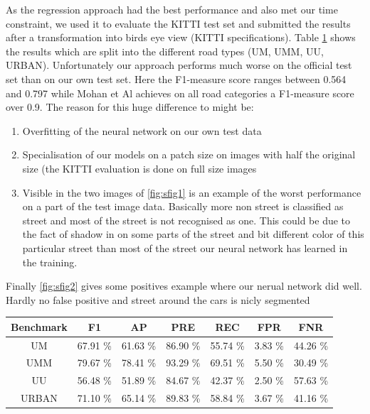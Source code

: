 As the regression approach had the best performance and also met our time constraint, we used it to evaluate the KITTI test set and submitted the results after a transformation into birds eye view (KITTI specifications). Table \ref{tab:kitti} shows the results which are split into the different road types (UM, UMM, UU, URBAN).
Unfortunately our approach performs much worse on the official test set than on our own test set. Here the F1-measure score ranges between 0.564 and 0.797 while Mohan et Al achieves on all road categories a F1-measure score over 0.9. The reason for this huge difference to might be: \\

\begin{enumerate}
  \item Overfitting of the neural network on our own test data
  \item Specialisation of our models on a patch size on images with half the original size (the KITTI evaluation is done on full size images
  \item Visible in the two images of \ref{fig:sfig1} is an example of the worst performance on a part of the test image data. Basically more non street is classified as street and most of the street is not recognised as one. This could be due to the fact of shadow in on some parts of the street and bit different color of this particular street than most of the street our neural network has learned in the training. 
  \end{enumerate}

Finally \ref{fig:sfig2} gives some positives example where our nerual network did well. Hardly no false positive and street around the cars is nicly segmented

      \begin{table}[h!]
  \begin{center}
  \label{tab:kitti}
\begin{tabular}{c|cccccc}
 {\bf Benchmark} & {\bf F1} & {\bf AP} & {\bf PRE} & {\bf REC} & {\bf FPR} & {\bf FNR}\\ \hline
UM & 67.91 \% & 61.63 \% & 86.90 \% & 55.74 \% & 3.83 \% & 44.26 \%\\
UMM & 79.67 \% & 78.41 \% & 93.29 \% & 69.51 \% & 5.50 \% & 30.49 \%\\
UU  & 56.48 \% & 51.89 \% & 84.67 \% & 42.37 \% & 2.50 \% & 57.63 \%\\
URBAN & 71.10 \% & 65.14 \% & 89.83 \% & 58.84 \% & 3.67 \% & 41.16 \%\\
\end{tabular}
  \end{center}
\end{table}




